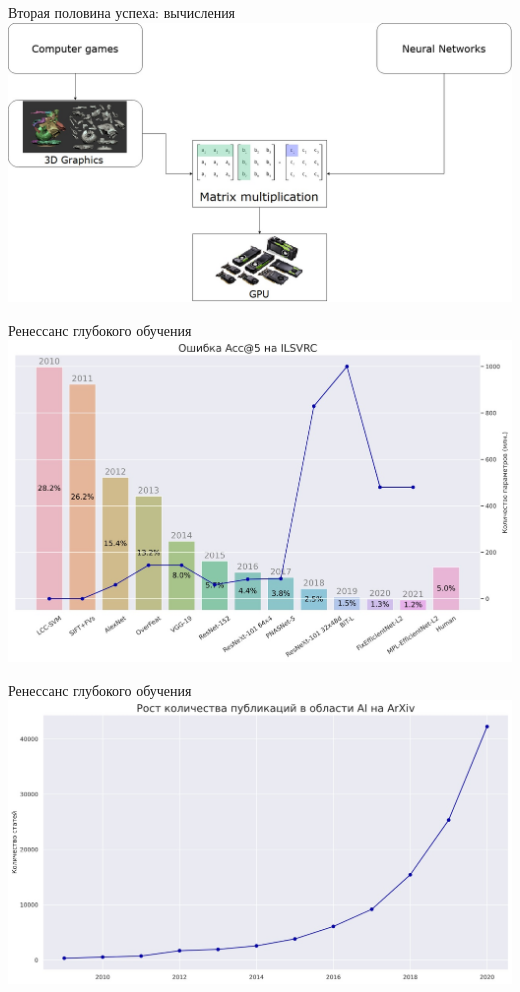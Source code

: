 \documentclass[aspectratio=169]{beamer}
\begin{document}
\begin{frame}{Вторая половина успеха: вычисления}
    \centering
    \includegraphics[width=.86\linewidth]{graphs/fig27.jpg}
\end{frame}

\begin{frame}{Ренессанс глубокого обучения}
    \centering
    \includegraphics[width=.75\linewidth]{graphs/fig28.jpg}
\end{frame}

\begin{frame}{Ренессанс глубокого обучения}
    \centering
    \includegraphics[width=.85\linewidth]{graphs/fig29.jpg}
\end{frame}
\end{document}
